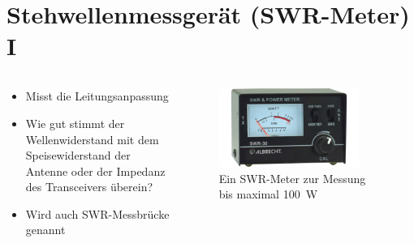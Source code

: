 
\section{Stehwellenmessgerät (SWR-Meter) I}
\label{section:swr_meter_1}
\begin{frame}%

\begin{columns}
    \begin{column}{0.48\textwidth}
    \begin{itemize}
  \item Misst die Leitungsanpassung
  \item Wie gut stimmt der Wellenwiderstand mit dem Speisewiderstand der Antenne oder der Impedanz des Transceivers überein?
  \item Wird auch SWR-Messbrücke genannt
  \end{itemize}

    \end{column}
   \begin{column}{0.48\textwidth}
       
\begin{figure}
    \includegraphics[width=0.85\textwidth]{foto/144}
    \caption{\scriptsize Ein SWR-Meter zur Messung bis maximal \qty{100}{\watt}}
    \label{e_swr_meter_geraet}
\end{figure}

   \end{column}
\end{columns}

\end{frame}

\begin{frame}
\end{frame}

